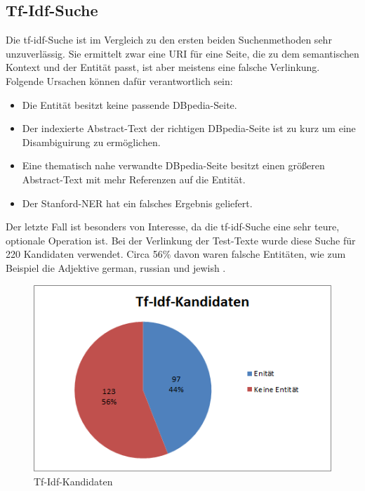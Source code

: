 \documentclass[11pt, a4paper, oneside]{Thesis} %
\begin{document}
\subsection{Tf-Idf-Suche}
Die tf-idf-Suche ist im Vergleich zu den ersten beiden Suchenmethoden sehr unzuverl\"assig. Sie ermittelt zwar eine URI f\"ur eine Seite, die zu dem   semantischen Kontext und der Entit\"at passt, ist aber meistens eine falsche Verlinkung. Folgende Ursachen k\"onnen daf\"ur verantwortlich sein:
\begin{itemize}
\item Die Entit\"at besitzt keine passende DBpedia-Seite.
\item Der indexierte Abstract-Text der richtigen DBpedia-Seite ist zu kurz um eine Disambiguirung zu erm\"oglichen.
\item Eine thematisch nahe verwandte DBpedia-Seite besitzt einen gr\"o\ss eren Abstract-Text mit mehr Referenzen auf die Entit\"at.
\item Der Stanford-NER hat ein falsches Ergebnis geliefert.
\end{itemize}
Der letzte Fall ist besonders von Interesse, da die tf-idf-Suche eine sehr teure, optionale Operation ist. Bei der Verlinkung der Test-Texte wurde diese Suche f\"ur 220 Kandidaten verwendet. Circa 56\% davon waren falsche Entit\"aten, wie zum Beispiel die Adjektive german, russian und jewish .
\begin{figure}[ht!]
\centering
\includegraphics[scale=1]{./tfPrecision.png}
\caption[Tf-Idf-Kandidaten]{Tf-Idf-Kandidaten}
\end{figure}
\end{document}
